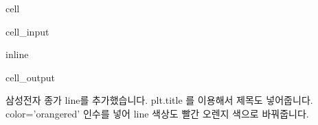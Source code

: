 \documentclass[letterpaper,10pt,english]{jupyterBook}
\begin{document}
\begin{sphinxuseclass}{cell}\begin{sphinxVerbatimInput}

\begin{sphinxuseclass}{cell_input}
\begin{sphinxVerbatim}[commandchars=\\\{\}]
   
 inline

\end{sphinxVerbatim}

\end{sphinxuseclass}\end{sphinxVerbatimInput}
\begin{sphinxVerbatimOutput}

\begin{sphinxuseclass}{cell_output}
\noindent{}

\end{sphinxuseclass}\end{sphinxVerbatimOutput}

\end{sphinxuseclass}
\sphinxAtStartPar
 삼성전자 종가 line를 추가했습니다. plt.title 를 이용해서 제목도 넣어줍니다. color=’orangered’ 인수를 넣어 line 색상도 빨간 오렌지 색으로 바꿔줍니다.
\end{document}
